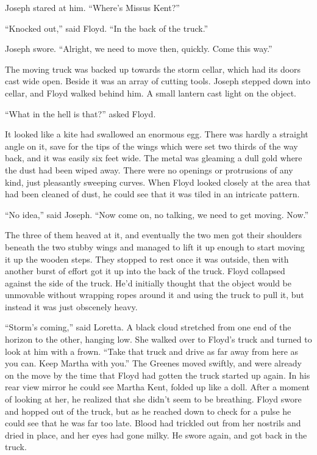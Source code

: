 \documentclass[ebook,12pt]{memoir}
\begin{document}
Joseph stared at him. ``Where's Missus Kent?''

``Knocked out,'' said Floyd. ``In the back of the truck.''

Joseph swore. ``Alright, we need to move then, quickly. Come this way.''

The moving truck was backed up towards the storm cellar, which had its
doors cast wide open. Beside it was an array of cutting tools. Joseph
stepped down into cellar, and Floyd walked behind him. A small lantern
cast light on the object.

``What in the hell is that?'' asked Floyd.

It looked like a kite had swallowed an enormous egg. There was hardly a
straight angle on it, save for the tips of the wings which were set two
thirds of the way back, and it was easily six feet wide. The metal was
gleaming a dull gold where the dust had been wiped away. There were no
openings or protrusions of any kind, just pleasantly sweeping curves.
When Floyd looked closely at the area that had been cleaned of dust, he
could see that it was tiled in an intricate pattern.

``No idea,'' said Joseph. ``Now come on, no talking, we need to get
moving. Now.''

The three of them heaved at it, and eventually the two men got their
shoulders beneath the two stubby wings and managed to lift it up enough
to start moving it up the wooden steps. They stopped to rest once it was
outside, then with another burst of effort got it up into the back of
the truck. Floyd collapsed against the side of the truck. He'd initially
thought that the object would be unmovable without wrapping ropes around
it and using the truck to pull it, but instead it was just obscenely
heavy.

``Storm's coming,'' said Loretta. A black cloud stretched from one end
of the horizon to the other, hanging low. She walked over to Floyd's
truck and turned to look at him with a frown. ``Take that truck and
drive as far away from here as you can. Keep Martha with you.'' The
Greenes moved swiftly, and were already on the move by the time that
Floyd had gotten the truck started up again. In his rear view mirror he
could see Martha Kent, folded up like a doll. After a moment of looking
at her, he realized that she didn't seem to be breathing. Floyd swore
and hopped out of the truck, but as he reached down to check for a pulse
he could see that he was far too late. Blood had trickled out from her
nostrils and dried in place, and her eyes had gone milky. He swore
again, and got back in the truck.
\end{document}
